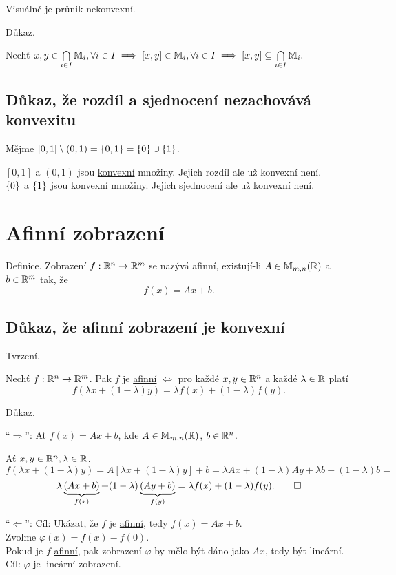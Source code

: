 Visuálně je průnik nekonvexní.

Důkaz.

Nechť ${x,y \in \bigcap\limits_{i \in I} \mathbb{M}_{i}, \forall i \in I \implies [x, y] \in \mathbb{M}_i, \forall i \in I
\implies [x,y] \subseteq \bigcap\limits_{i \in I} \mathbb{M}_{i}.}$

\subsection{Důkaz, že rozdíl a sjednocení nezachovává konvexitu}
Mějme $[0,1] \setminus (0,1) = \left\lbrace 0,1 \right\rbrace = \left\lbrace 0 \right\rbrace \cup \left\lbrace 1 \right\rbrace$.

$[0,1]$ a $(0,1)$ jsou \hyperref[sec:konvex]{konvexní} množiny. Jejich rozdíl ale už konvexní není.\\
$\left\lbrace 0 \right\rbrace$ a $\left\lbrace 1 \right\rbrace$ jsou konvexní množiny. Jejich sjednocení ale už konvexní není.

\section*{Afinní zobrazení} \label{sec:afin}
Definice. Zobrazení $f: \mathbb{R}^n \rightarrow \mathbb{R}^m$ se nazývá afinní, existují-li $A \in \mathbb{M}_{m,n} (\mathbb{R})$ a $b \in \mathbb{R}^m$
tak, že \[f(x) = Ax + b.\]

\subsection{Důkaz, že afinní zobrazení je konvexní}
Tvrzení.

Nechť $f: \mathbb{R}^n \rightarrow \mathbb{R}^m$. Pak $f$ je \hyperref[sec:afin]{afinní} $\iff$ pro každé $x,y \in \mathbb{R}^n$ a každé
$\lambda \in \mathbb{R}$ platí
\[f(\lambda x + (1-\lambda) y) =\lambda f(x) + (1-\lambda) f(y)\text{.}\]

Důkaz.

\enquote{$\Rightarrow$}: Ať $f(x) = Ax + b$, kde $A \in \mathbb{M}_{m,n} (\mathbb{R})$, $b \in \mathbb{R}^n$.

Ať $x, y \in \mathbb{R}^n, \lambda \in \mathbb{R}$.
\[
    f(\lambda x + (1 - \lambda) y) = A [\lambda x + (1-\lambda) y] + b = \lambda A x + (1-\lambda)Ay + \lambda b +
    (1-\lambda)b =
\]
\[
    \lambda \underbrace{(Ax + b)}_{f(x)} + (1-\lambda)\underbrace{(Ay + b)}_{f(y)} = \lambda f(x) + (1-\lambda)f(y). \qed
\]

\enquote{$\Leftarrow$}:
Cíl: Ukázat, že $f$ je \hyperref[sec:afin]{afinní}, tedy $f(x) = Ax + b$.\\
Zvolme $\varphi(x) = f(x) - f(0)$.\\
Pokud je $f$ \hyperref[sec:afin]{afinní}, pak zobrazení $\varphi$ by mělo být dáno jako $Ax$, tedy být lineární.\\
Cíl: $\varphi$ je lineární zobrazení.

